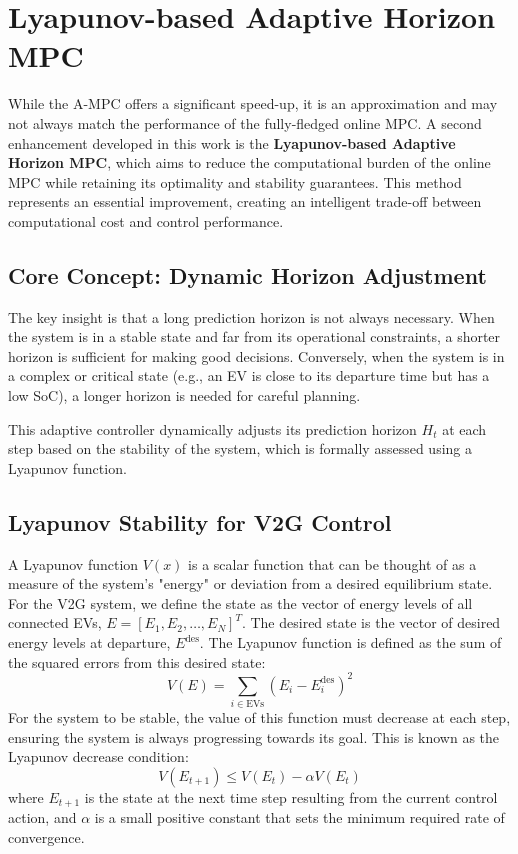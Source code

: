 \section{Lyapunov-based Adaptive Horizon MPC}
While the A-MPC offers a significant speed-up, it is an approximation and may not always match the performance of the fully-fledged online MPC. A second enhancement developed in this work is the \textbf{Lyapunov-based Adaptive Horizon MPC}, which aims to reduce the computational burden of the online MPC while retaining its optimality and stability guarantees. This method represents an essential improvement, creating an intelligent trade-off between computational cost and control performance.

\subsection{Core Concept: Dynamic Horizon Adjustment}
The key insight is that a long prediction horizon is not always necessary. When the system is in a stable state and far from its operational constraints, a shorter horizon is sufficient for making good decisions. Conversely, when the system is in a complex or critical state (e.g., an EV is close to its departure time but has a low SoC), a longer horizon is needed for careful planning.

This adaptive controller dynamically adjusts its prediction horizon $H_t$ at each step based on the stability of the system, which is formally assessed using a Lyapunov function.

\subsection{Lyapunov Stability for V2G Control}
A Lyapunov function $V(x)$ is a scalar function that can be thought of as a measure of the system's "energy" or deviation from a desired equilibrium state. For the V2G system, we define the state as the vector of energy levels of all connected EVs, $E = [E_1, E_2, \dots, E_N]^T$. The desired state is the vector of desired energy levels at departure, $E^{\text{des}}$. The Lyapunov function is defined as the sum of the squared errors from this desired state:
\begin{equation}
    V(E) = \sum_{i \in \text{EVs}} (E_i - E_i^{\text{des}})^2
\end{equation}
For the system to be stable, the value of this function must decrease at each step, ensuring the system is always progressing towards its goal. This is known as the Lyapunov decrease condition:
\begin{equation}
    V(E_{t+1}) \le V(E_t) - \alpha V(E_t)
\end{equation}
where $E_{t+1}$ is the state at the next time step resulting from the current control action, and $\alpha$ is a small positive constant that sets the minimum required rate of convergence.

